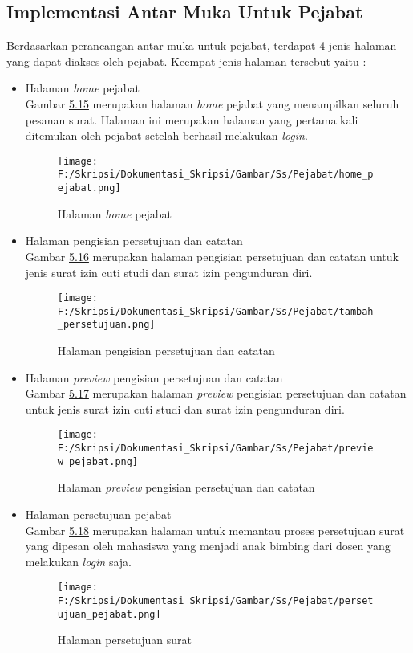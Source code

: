 \subsection{Implementasi Antar Muka Untuk Pejabat}
\label{sec:implementasi_antar_muka_pejabat}
Berdasarkan perancangan antar muka untuk pejabat, terdapat 4 jenis halaman yang dapat diakses oleh pejabat. Keempat jenis halaman tersebut yaitu :
\begin{itemize}
	\item Halaman \textit{home} pejabat\\
	 Gambar \hyperlink{halaman_home_pejabat}{5.15} merupakan halaman \textit{home} pejabat yang menampilkan seluruh pesanan surat. Halaman ini merupakan halaman yang pertama kali ditemukan oleh pejabat setelah berhasil melakukan \textit{login}.
	 \begin{figure}[H]
	\centering
		\texttt{[image: F:/Skripsi/Dokumentasi\_Skripsi/Gambar/Ss/Pejabat/home\_pejabat.png]}
		\caption{Halaman \textit{home} pejabat}
		\label{fig:halaman_home_pejabat}
	\end{figure}
	
	\item Halaman pengisian persetujuan dan catatan\\
	 Gambar \hyperlink{halaman_persetujuan_dan_catatan}{5.16} merupakan halaman pengisian persetujuan dan catatan untuk jenis surat izin cuti studi dan surat izin pengunduran diri.
	 \begin{figure}[H]
	\centering
		\texttt{[image: F:/Skripsi/Dokumentasi\_Skripsi/Gambar/Ss/Pejabat/tambah\_persetujuan.png]}
		\caption{Halaman pengisian persetujuan dan catatan}
		\label{fig:halaman_persetujuan_dan_catatan}
	\end{figure}
	
	\item Halaman \textit{preview} pengisian persetujuan dan catatan\\
	 Gambar \hyperlink{halaman_preview_persetujuan_dan_catatan}{5.17} merupakan halaman \textit{preview} pengisian persetujuan dan catatan untuk jenis surat izin cuti studi dan surat izin pengunduran diri.
	 \begin{figure}[H]
	\centering
		\texttt{[image: F:/Skripsi/Dokumentasi\_Skripsi/Gambar/Ss/Pejabat/preview\_pejabat.png]}
		\caption{Halaman \textit{preview} pengisian persetujuan dan catatan}
		\label{fig:halaman_preview_persetujuan_dan_catatan}
	\end{figure}
	
	\item Halaman persetujuan pejabat\\
	 Gambar \hyperlink{halaman_persetujuan_surat}{5.18} merupakan halaman untuk memantau proses persetujuan surat yang dipesan oleh mahasiswa yang menjadi anak bimbing dari dosen yang melakukan \textit{login} saja.
	 \begin{figure}[H]
	\centering
		\texttt{[image: F:/Skripsi/Dokumentasi\_Skripsi/Gambar/Ss/Pejabat/persetujuan\_pejabat.png]}
		\caption{Halaman persetujuan surat}
		\label{fig:halaman_persetujuan_surat}
	\end{figure}
\end{itemize}

